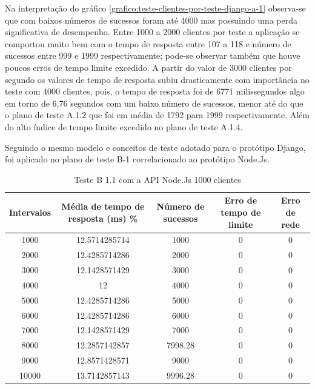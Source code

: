   Na interpretação do gráfico \ref{grafico:teste-clientes-por-teste-django-a-1}  observa-se que com baixos números de sucessos foram 
  até 4000 mas possuindo uma perda significativa de desempenho. Entre 1000 a 2000 clientes por teste a aplicação se comportou muito bem
  com o tempo de resposta entre 107 a 118 e número de sucessos entre 999 e 1999 respectivamente; pode-se observar também que houve poucos
  erros de tempo limite excedido. A partir do valor de 3000 clientes por segundo os valores de tempo de resposta subiu drasticamente
  com importância no teste com 4000 clientes, pois, o tempo de resposta foi de 6771 milissegundos algo em torno de 6,76 segundos com um 
  baixo número de sucessos, menor até do que o plano de teste A.1.2 que foi em média de 1792 para 1999 respectivamente. Além do alto índice
  de tempo limite excedido no plano de teste A.1.4.
  
  Seguindo o mesmo modelo e conceitos de teste adotado para o protótipo Django, foi aplicado no plano de teste 
  B-1 correlacionado ao protótipo Node.Js. 
   
  \begin{table}[H]
    \centering
    \footnotesize
    \setlength{\abovecaptionskip}{0pt}
    \setlength{\belowcaptionskip}{0pt}
    \caption[Teste B-1.1 com a API 1000 clientes]{Teste B 1.1 com a API Node.Js 1000 clientes}
    \label{tab:teste-b-1-1}
    \begin{tabular}{c|c|c|c|c}
      \hline \hline
      Intervalos  & 	Média de tempo de resposta (ms) \% &	Número de sucessos & 	Erro de tempo de limite &	Erro de rede \\ 
      \hline \hline
      1000 &		12.5714285714 &				1000 & 				0 &				0 \\
      2000 &		12.4285714286 &				2000 & 				0 &				0 \\
      3000 &		12.1428571429 &				3000 & 				0 &				0 \\
      4000 &		12 &					4000 & 				0 &				0 \\
      5000 &		12.4285714286 &				5000 & 				0 &				0 \\
      6000 &		12.4285714286 &				6000 & 				0 &				0 \\
      7000 &		12.1428571429 &				7000 & 				0 &				0 \\
      8000 &		12.2857142857 &				7998.28 & 			0 &				0 \\
      9000 &		12.8571428571 &				9000 & 				0 &				0 \\
      10000 &		13.7142857143 &				9996.28 &		 	0 &				0 \\
      \hline \hline
    \end{tabular}
  \end{table}
  
